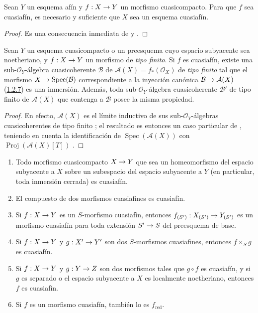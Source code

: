 \documentclass[oneside,10pt]{amsart}
\makeatletter
\newcommand{\ega@arrow}[2]{\mathchoice{#1}{#2}{#2}{#2}}
\renewcommand{\to}{\ega@arrow{\longrightarrow}{\rightarrow}}
\let\EGAOriginalLabel\label
\renewcommand{\label}[1]{\phantomsection\EGAOriginalLabel{#1}}
\makeatother
\begin{document}
\begin{corollary}[5.1.8]
\label{II.5.1.8-fr}
Sean $Y$ un esquema afín y $f:X\to Y$ un morfismo cuasicompacto.
Para que $f$ sea cuasiafín, es necesario y suficiente que $X$ sea un esquema cuasiafín.
\end{corollary}

\begin{proof}
Es una consecuencia inmediata de  y .
\end{proof}

\begin{corollary}[5.1.9]
\label{II.5.1.9-fr}
Sean $Y$ un esquema cuasicompacto o un preesquema cuyo espacio subyacente sea noetheriano, y $f:X\to Y$ un morfismo de \emph{tipo finito}.
Si $f$ es cuasiafín, existe una sub-$\mathcal{O}_Y$-álgebra cuasicoherente $\mathcal{B}$ de $\mathcal{A}(X)=f_*(\mathcal{O}_X)$ de \emph{tipo finito}  tal que el morfismo $X\to\operatorname{Spec}(\mathcal{B})$ correspondiente a la inyección canónica $\mathcal{B}\to\mathcal{A}(X)$ \textup{(\hyperref[II.1.2.7-fr]{1.2.7})} es una inmersión.
Además, toda sub-$\mathcal{O}_Y$-álgebra cuasicoherente $\mathcal{B}'$ de tipo finito de $\mathcal{A}(X)$ que contenga a $\mathcal{B}$ posee la misma propiedad.
\end{corollary}

\begin{proof}
En efecto, $\mathcal{A}(X)$ es el límite inductivo de sus sub-$\mathcal{O}_Y$-álgebras cuasicoherentes de tipo finito ;
el resultado es entonces un caso particular de , teniendo en cuenta la identificación de $\operatorname{Spec}(\mathcal{A}(X))$ con $\operatorname{Proj}(\mathcal{A}(X)[T])$ .
\end{proof}

\begin{proposition}[5.1.10]
\label{II.5.1.10-fr}
\medskip\noindent
\begin{enumerate}
  \item[{\rm(i)}] Todo morfismo cuasicompacto $X\to Y$ que sea un homeomorfismo del espacio subyacente a $X$ sobre un subespacio del espacio subyacente a $Y$ (en particular, toda inmersión cerrada) es cuasiafín.
  \item[{\rm(ii)}] El compuesto de dos morfismos cuasiafines es cuasiafín.
  \item[{\rm(iii)}] Si $f:X\to Y$ es un $S$-morfismo cuasiafín, entonces $f_{(S')}:X_{(S')}\to Y_{(S')}$ es un morfismo cuasiafín para toda extensión $S'\to S$ del preesquema de base.
  \item[{\rm(iv)}] Si $f:X\to Y$ y $g:X'\to Y'$ son dos $S$-morfismos cuasiafines, entonces $f\times_S g$ es cuasiafín.
  \item[{\rm(v)}] Si $f:X\to Y$ y $g:Y\to Z$ son dos morfismos tales que $g\circ f$ es cuasiafín, y si $g$ es separado o el espacio subyacente a $X$ es localmente noetheriano, entonces $f$ es cuasiafín.
  \item[{\rm(vi)}] Si $f$ es un morfismo cuasiafín, también lo es $f_{\mathrm{red}}$.
\end{enumerate}
\end{proposition}
\end{document}
